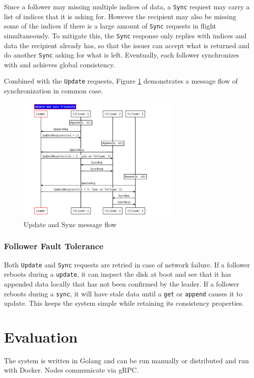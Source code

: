 \documentclass[11pt,english,twocolumn]{article}
\begin{document}
Since a follower may missing multiple indices of data, a \texttt{Sync} request
may carry a list of indices that it is asking for. However the recipient may
also be missing some of the indices if there is a large amount of \texttt{Sync}
requests in flight simultaneously. To mitigate this, the \texttt{Sync} response
only replies with indices and data the recipient already has, so that the
issuer can accept what is returned and do another \texttt{Sync} asking for
what is left. Eventually, each follower synchronizes with and achieves global
consistency.

Combined with the \texttt{Update} requests, Figure \ref{UpdateAndSync}
demonstrates a message flow of synchronization in common case.

\begin{figure}[h]
\includegraphics[width=8cm]{figure/UpdateAndSync.pdf}
\caption{Update and Sync message flow}
\label{UpdateAndSync}
\end{figure}

\subsubsection{Follower Fault Tolerance}
Both \texttt{Update} and \texttt{Sync} requests are retried in case of network
failure. If a follower reboots during a \texttt{update}, it can inspect the disk
at boot and see that it has appended data locally that has not been confirmed by
the leader. If a follower reboots during a \texttt{sync}, it will have stale
data until a \texttt{get} or \texttt{append} causes it to update. This keeps the
system simple while retaining its consistency properties.

\vspace{-0.4cm}
\section{Evaluation}
The system is written in Golang and can be run manually or distributed and
run with Docker. Nodes communicate via gRPC. 
\end{document}
